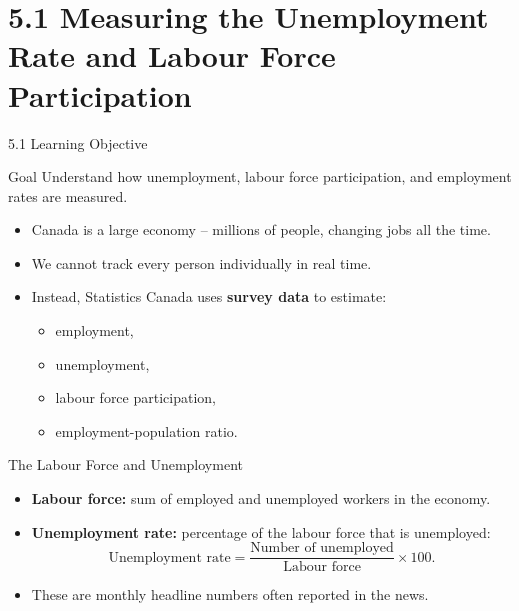 \documentclass[aspectratio=169]{beamer}
\begin{document}
\section{5.1 Measuring the Unemployment Rate and Labour Force Participation}

\begin{frame}{5.1 Learning Objective}
\transfade
\begin{block}{Goal}
Understand how unemployment, labour force participation, and employment rates are measured.
\end{block}
\begin{itemize}[<+->]
  \item Canada is a large economy – millions of people, changing jobs all the time.
  \item We cannot track every person individually in real time.
  \item Instead, Statistics Canada uses \textbf{survey data} to estimate:
  \begin{itemize}[<+->]
    \item employment,
    \item unemployment,
    \item labour force participation,
    \item employment-population ratio.
  \end{itemize}
\end{itemize}
\end{frame}

\begin{frame}{The Labour Force and Unemployment}
\transfade
\begin{itemize}[<+->]
  \item \textbf{Labour force:} sum of \alert{employed} and \alert{unemployed} workers in the economy.
  \item \textbf{Unemployment rate:} percentage of the labour force that is unemployed:
  \[
    \text{Unemployment rate} = 
    \frac{\text{Number of unemployed}}{\text{Labour force}} \times 100.
  \]
  \item These are monthly headline numbers often reported in the news.
\end{itemize}
\end{frame}
\end{document}
